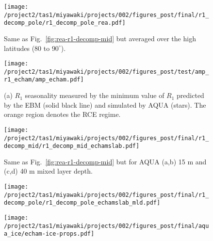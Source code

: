 \documentclass{ametsocV5}
\begin{document}
\begin{figure}[t]
  \noindent\texttt{[image: /project2/tas1/miyawaki/projects/002/figures\_post/final/r1\_decomp\_pole/r1\_decomp\_pole\_rea.pdf]}\\
  \caption{Same as Fig.~\ref{fig:rea-r1-decomp-mid} but averaged over the high latitudes ($80$ to $90^{\circ}$).}
  \label{fig:rea-r1-decomp-pole}
\end{figure}

\begin{figure}
  \noindent\texttt{[image: /project2/tas1/miyawaki/projects/002/figures\_post/test/amp\_r1\_echam/amp\_echam.pdf]}\\
  \caption{(a) $R_1$ seasonality measured by the minimum value of $R_1$ predicted by the EBM (solid black line) and simulated by AQUA (stars). The orange region denotes the RCE regime.}
  \label{fig:amp-r1-echam}
\end{figure}

\begin{figure}[t]
    \noindent\texttt{[image: /project2/tas1/miyawaki/projects/002/figures\_post/final/r1\_decomp\_mid/r1\_decomp\_mid\_echamslab.pdf]}\\
    \caption{Same as Fig.~\ref{fig:rea-r1-decomp-mid} but for AQUA (a,b) 15 m and (c,d) 40 m mixed layer depth.}
\label{fig:echam-rce}
\end{figure}

\begin{figure}[t]
    \noindent\texttt{[image: /project2/tas1/miyawaki/projects/002/figures\_post/final/r1\_decomp\_pole/r1\_decomp\_pole\_echamslab\_mld.pdf]}\\
    \caption{}
    \label{fig:echam-rae-mld}
\end{figure}

\begin{figure}[t]
    \centering
    \noindent\texttt{[image: /project2/tas1/miyawaki/projects/002/figures\_post/final/aqua\_ice/echam-ice-props.pdf]}\\
    \caption{}
    \label{fig:echam-ice-props}
\end{figure}
\end{document}
